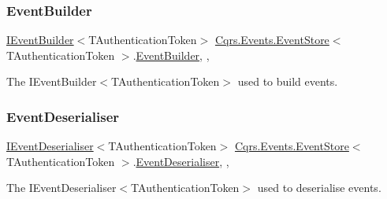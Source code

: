 \subsubsection{\texorpdfstring{Event\+Builder}{EventBuilder}}
{\footnotesize\ttfamily \hyperlink{interfaceCqrs_1_1Events_1_1IEventBuilder}{I\+Event\+Builder}$<$T\+Authentication\+Token$>$ \hyperlink{classCqrs_1_1Events_1_1EventStore}{Cqrs.\+Events.\+Event\+Store}$<$ T\+Authentication\+Token $>$.\hyperlink{classCqrs_1_1Events_1_1EventBuilder}{Event\+Builder}\hspace{0.3cm}{\ttfamily [get]}, {\ttfamily [set]}, {\ttfamily [protected]}}



The I\+Event\+Builder$<$\+T\+Authentication\+Token$>$ used to build events. 

\mbox{\label{classCqrs_1_1Events_1_1EventStore_a24f17302c069058e5814dedfb614d599_a24f17302c069058e5814dedfb614d599}} 
\subsubsection{\texorpdfstring{Event\+Deserialiser}{EventDeserialiser}}
{\footnotesize\ttfamily \hyperlink{interfaceCqrs_1_1Events_1_1IEventDeserialiser}{I\+Event\+Deserialiser}$<$T\+Authentication\+Token$>$ \hyperlink{classCqrs_1_1Events_1_1EventStore}{Cqrs.\+Events.\+Event\+Store}$<$ T\+Authentication\+Token $>$.\hyperlink{classCqrs_1_1Events_1_1EventDeserialiser}{Event\+Deserialiser}\hspace{0.3cm}{\ttfamily [get]}, {\ttfamily [set]}, {\ttfamily [protected]}}



The I\+Event\+Deserialiser$<$\+T\+Authentication\+Token$>$ used to deserialise events. 

\mbox{\label{classCqrs_1_1Events_1_1EventStore_a99506f7136a658364f8b74ef6a779a3f_a99506f7136a658364f8b74ef6a779a3f}} 
